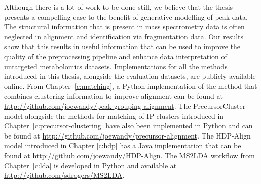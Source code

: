 Although there is a lot of work to be done still, we believe that the thesis presents a compelling case to the benefit of generative modelling of peak data. The structural information that is present in mass spectrometry data is often neglected in alignment and identification via fragmentation data. Our results show that this results in useful information that can be used to improve the quality of the preprocessing pipeline and enhance data interpretation of untargeted metabolomics datasets. Implementations for all the methods introduced in this thesis, alongside the evaluation datasets, are publicly available online. From Chapter~\ref{c:matching}, a Python implementation of the method that combines clustering information to improve alignment can be found at \href{http://github.com/joewandy/peak-grouping-alignment}{http://github.com/joewandy/peak-grouping-alignment}. The PrecursorCluster model alongside the methods for matching of IP clusters introduced in Chapter~\ref{c:precursor-clustering} have also been implemented in Python and can be found at \href{http://github.com/joewandy/precursor-alignment}{http://github.com/joewandy/precursor-alignment}. The HDP-Align model introduced in Chapter \ref{c:hdp} has a Java implementation that can be found at \href{http://github.com/joewandy/HDP-Align}{http://github.com/joewandy/HDP-Align}. The MS2LDA workflow from Chapter~\ref{c:lda} is developed in Python and available at \href{http://github.com/sdrogers/MS2LDA}{http://github.com/sdrogers/MS2LDA}.